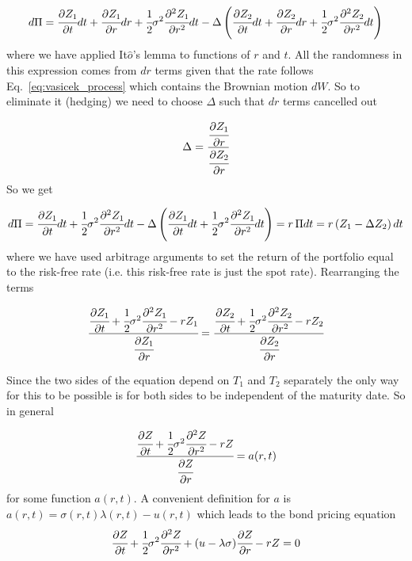 \begin{equation*}
d\Pi = \cfrac{\partial Z_1}{\partial t}dt + \cfrac{\partial Z_1}{\partial r}dr + \cfrac{1}{2}\sigma^2 \cfrac{\partial^2 Z_1}{\partial r^2}dt - \Delta\left(\cfrac{\partial Z_2}{\partial t}dt + \cfrac{\partial Z_2}{\partial r}dr + \cfrac{1}{2}\sigma^2 \cfrac{\partial^2 Z_2}{\partial r^2}dt\right)
\end{equation*}
where we have applied It$\hat{o}$'s lemma to functions of $r$ and $t$. All the randomness in this expression comes from $dr$ terms given that the rate follows Eq.~\ref{eq:vasicek_process} which contains the Brownian motion $dW$. So to eliminate it (hedging) we need to choose $\Delta$ such that $dr$ terms cancelled out

\begin{equation*}
\Delta = \cfrac{\cfrac{\partial Z_1}{\partial r}}{\cfrac{\partial Z_2}{\partial r}}
\end{equation*}
So we get

\begin{equation*}
d\Pi = \cfrac{\partial Z_1}{\partial t}dt + \cfrac{1}{2}\sigma^2 \cfrac{\partial^2 Z_1}{\partial r^2}dt - \Delta\left(\cfrac{\partial Z_1}{\partial t}dt + \cfrac{1}{2}\sigma^2 \cfrac{\partial^2 Z_1}{\partial r^2}dt\right) = r\, \Pi dt = r \left(Z_1 - \Delta Z_2\right)dt
\end{equation*}
where we have used arbitrage arguments to set the return of the portfolio equal to the risk-free rate (i.e. this risk-free rate is just the spot rate). Rearranging the terms

\begin{equation*}
\cfrac{\cfrac{\partial Z_1}{\partial t} + \cfrac{1}{2}\sigma^2 \cfrac{\partial^2 Z_1}{\partial r^2} - rZ_1}{\cfrac{\partial Z_1}{\partial r}}=\cfrac{\cfrac{\partial Z_2}{\partial t} + \cfrac{1}{2}\sigma^2 \cfrac{\partial^2 Z_2}{\partial r^2} - rZ_2}{\cfrac{\partial Z_2}{\partial r}}
\end{equation*}

Since the two sides of the equation depend on $T_1$ and $T_2$ separately the only way for this to be possible is for both sides to be independent of the maturity date. So in general

\begin{equation*}
\cfrac{\cfrac{\partial Z}{\partial t} + \cfrac{1}{2}\sigma^2 \cfrac{\partial^2 Z}{\partial r^2} - rZ}{\cfrac{\partial Z}{\partial r}}= a(r, t)
\end{equation*}
for some function $a(r, t)$. A convenient definition for $a$ is $a(r, t) = \sigma(r, t )\lambda(r, t) − u(r, t)$ which leads to the bond pricing equation
\begin{equation}
\cfrac{\partial Z}{\partial t} + \cfrac{1}{2}\sigma^2 \cfrac{\partial^2 Z}{\partial r^2} + (u - \lambda\sigma)\cfrac{\partial Z}{\partial r} - rZ = 0
\label{eq:bond_pricing_equation}
\end{equation}

